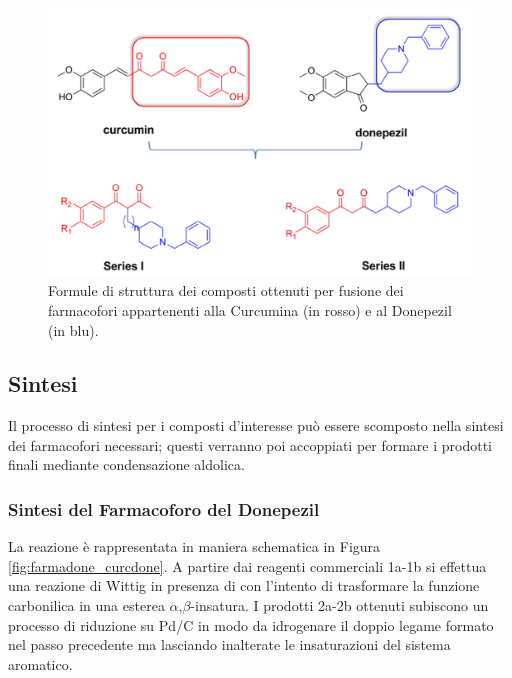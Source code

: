 \documentclass[a4paper, 12pt]{article}
\begin{document}
\begin{figure}[H]
	\centering
	\includegraphics[width=\linewidth]{immagini/generale_curcdone.png}
	\caption{Formule di struttura dei composti ottenuti per fusione dei farmacofori appartenenti alla Curcumina (in rosso) e al Donepezil (in blu).}
	\label{fig:generale_curcdone}
\end{figure}



\subsection{Sintesi}
Il processo di sintesi per i composti d'interesse può essere scomposto nella sintesi dei farmacofori necessari; questi verranno poi accoppiati per formare i prodotti finali mediante condensazione aldolica.

\subsubsection{Sintesi del Farmacoforo del Donepezil}
\label{sec:sintesidone}
La reazione è rappresentata in maniera schematica in Figura \ref{fig:farmadone_curcdone}. A partire dai reagenti commerciali 1a-1b si effettua una reazione di Wittig in presenza di  con l'intento di trasformare la funzione carbonilica in una esterea \(\alpha\),\(\beta\)-insatura. I prodotti 2a-2b ottenuti subiscono un processo di riduzione su Pd/C in modo da idrogenare il doppio legame formato nel passo precedente ma lasciando inalterate le insaturazioni del sistema aromatico.
\end{document}
